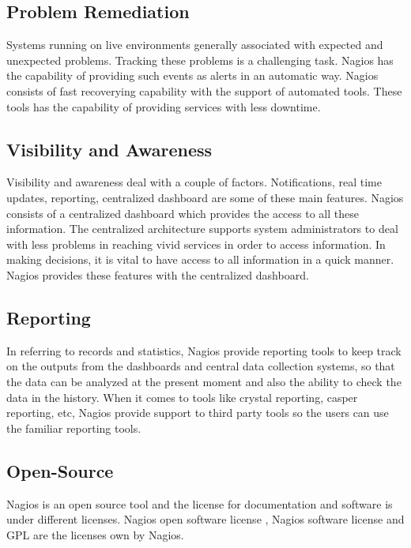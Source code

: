 \documentclass[9pt,twocolumn,twoside]{../../styles/osajnl}
\begin{document}
\subsection{Problem Remediation}

Systems running on live environments generally associated with
expected and unexpected problems. Tracking these problems is a
challenging task.  Nagios has the capability of providing such events
as alerts in an automatic way.  Nagios consists of fast recoverying
capability with the support of automated tools. These tools has the
capability of providing services with less downtime. 

\subsection{Visibility and Awareness}

Visibility and awareness deal with a couple of factors. Notifications,
real time updates, reporting, centralized dashboard are some of these
main features. Nagios consists of a centralized dashboard which
provides the access to all these information. The centralized
architecture supports system administrators to deal with less problems
in reaching vivid services in order to access information. In making
decisions, it is vital to have access to all information in a quick
manner.  Nagios provides these features with the centralized
dashboard.

\subsection{Reporting}

In referring to records and statistics, Nagios provide reporting tools
to keep track on the outputs from the dashboards and central
data collection systems, so that the data can be analyzed at the
present moment and also the ability to check the data in the history.
When it comes to tools like crystal reporting, casper
reporting, etc, Nagios provide support to third party tools so the
users can use the familiar reporting tools.

\subsection{Open-Source}

Nagios is an open source tool and the license for documentation and software
is under different licenses. Nagios open software license \cite{op-sw-lic-nagios}, Nagios software
license \cite{sw-lic-nagios} and GPL are the licenses own by Nagios. 
\end{document}
